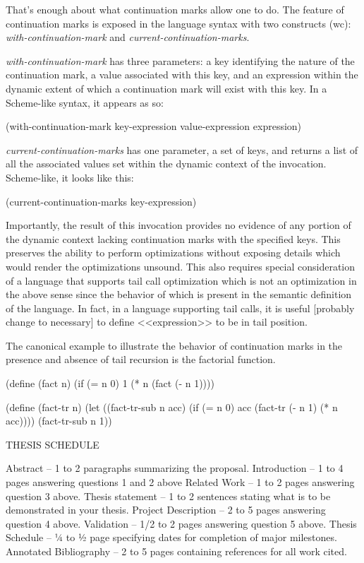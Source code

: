 \documentclass[ms]{byuprop}
\begin{document}
That's enough about what continuation marks allow one to do. The feature of continuation marks is exposed in the language syntax with two constructs (wc): \emph{with-continuation-mark} and \emph{current-continuation-marks}.

\emph{with-continuation-mark} has three parameters: a key identifying the nature of the continuation mark, a value associated with this key, and an expression within the dynamic extent of which a continuation mark will exist with this key. In a Scheme-like syntax, it appears as so:

(with-continuation-mark key-expression value-expression expression)

\emph{current-continuation-marks} has one parameter, a set of keys, and returns a list of all the associated values set within the dynamic context of the invocation. Scheme-like, it looks like this:

(current-continuation-marks key-expression)

Importantly, the result of this invocation provides no evidence of any portion of the dynamic context lacking continuation marks with the specified keys. This preserves the ability to perform optimizations without exposing details which would render the optimizations unsound. This also requires special consideration of a language that supports tail call optimization which is not an optimization in the above sense since the behavior of which is present in the semantic definition of the language. In fact, in a language supporting tail calls, it is useful [probably change to necessary] to define <<expression>> to be in tail position.

The canonical example to illustrate the behavior of continuation marks in the presence and absence of tail recursion is the factorial function.

(define (fact n)
    (if (= n 0)
        1
        (* n (fact (- n 1))))
        
(define (fact-tr n)
  (let ((fact-tr-sub n acc)
          (if (= n 0)
              acc
              (fact-tr (- n 1) (* n acc))))
    (fact-tr-sub n 1))
    
    
THESIS SCHEDULE

Abstract – 1 to 2 paragraphs summarizing the proposal.
Introduction – 1 to 4 pages answering questions 1 and 2 above
Related Work – 1 to 2 pages answering question 3 above.
Thesis statement – 1 to 2 sentences stating what is to be demonstrated in your thesis.
Project Description – 2 to 5 pages answering question 4 above.
Validation – 1/2 to 2 pages answering question 5 above.
Thesis Schedule – ¼ to ½ page specifying dates for completion of major milestones.
Annotated Bibliography – 2 to 5 pages containing references for all work cited.




\end{document}
